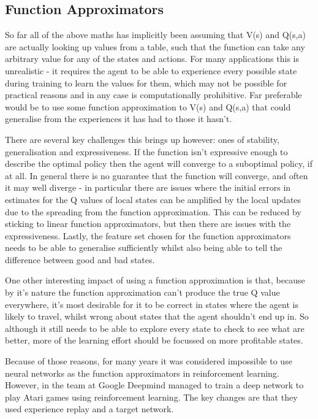 \subsection{Function Approximators}
So far all of the above maths has implicitly been assuming that V(s) and Q(s,a) are actually looking up values from a table, such that the function can take any arbitrary value for any of the states and actions. For many applications this is unrealistic - it requires the agent to be able to experience every possible state during training to learn the values for them, which may not be possible for practical reasons and in any case is computationally prohibitive. Far preferable would be to use some function approximation to V(s) and Q(s,a) that could generalise from the experiences it has had to those it hasn't.

There are several key challenges this brings up however: ones of stability, generalisation and expressiveness. If the function isn't expressive enough to describe the optimal policy then the agent will converge to a suboptimal policy, if at all. In general there is no guarantee that the function will converge, and often it may well diverge - in particular there are issues where the initial errors in estimates for the Q values of local states can be amplified by the local updates due to the spreading from the function approximation. This can be reduced by sticking to linear function approximators, but then there are issues with the expressiveness. Lastly, the feature set chosen for the function approximators needs to be able to generalise sufficiently whilst also being able to tell the difference between good and bad states.

One other interesting impact of using a function approximation is that, because by it's nature the function approximation can't produce the true Q value everywhere, it's most desirable for it to be correct in states where the agent is likely to travel, whilst wrong about states that the agent shouldn't end up in. So although it still needs to be able to explore every state to check to see what are better, more of the learning effort should be focussed on more profitable states.

Because of those reasons, for many years it was considered impossible to use neural networks as the function approximators in reinforcement learning. However, in \cite{atariDQN} the team at Google Deepmind managed to train a deep network to play Atari games using reinforcement learning. The key changes are that they used experience replay and a target network. 

